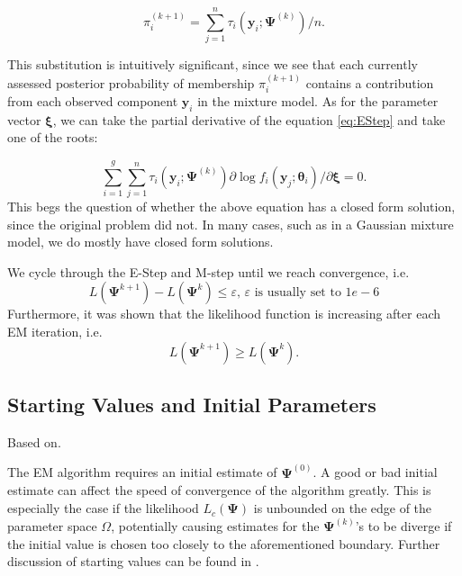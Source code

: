 \documentclass{article}\usepackage[]{graphicx}\usepackage[]{xcolor}
\theoremstyle{plain}
\theoremstyle{definition}
\theoremstyle{remark}
\newcommand{\boldy}{\mathbf{y}}
\newcommand{\boldtheta}{\boldsymbol{\theta}}
\newcommand{\boldPsi}{\boldsymbol{\Psi}}
\newcommand{\boldxi}{\boldsymbol{\xi}}
\begin{document}
\begin{equation}\label{eq:MStep1}
  \pi_i^{(k+1)} = \sum_{j=1}^n \tau_i (\boldy_i ; \boldPsi^{(k)}) / n.
\end{equation}

This substitution is intuitively significant, since we see that each currently assessed posterior probability of membership $\pi_i^{(k+1)}$ contains a contribution from each observed component $\boldy_i$ in the mixture model. As for the parameter vector $\boldxi$, we can take the partial derivative of the equation \eqref{eq:EStep} and take one of the roots:

\begin{equation}\label{eq:MStep2}
  \sum_{i=1}^g \sum_{j=1}^n \tau_i (\boldy_i ; \boldPsi^{(k)}) \partial \log f_i (\boldy_j ; \boldtheta_i) / \partial \boldxi = 0.
\end{equation}
This begs the question of whether the above equation has a closed form solution, since the original problem did not. In many cases, such as in a Gaussian mixture model, we do mostly have closed form solutions.

We cycle through the E-Step and M-step until we reach convergence, i.e.
\begin{equation*}
  L(\boldPsi^{k+1}) - L(\boldPsi^{k}) \leq \varepsilon, \, \varepsilon \text{ is usually set to } 1e-6
\end{equation*}
Furthermore, it was shown that the likelihood function is increasing after each EM iteration, i.e.
\begin{equation}
  L(\boldPsi^{k+1}) \geq L(\boldPsi^{k}).
\end{equation}


\subsection{Starting Values and Initial Parameters}
Based on\cite[Sections 2.10, 2.12]{FMMs_Book}.

The EM algorithm requires an initial estimate of $\boldPsi^{(0)}$. A good or bad initial estimate can affect the speed of convergence of the algorithm greatly. This is especially the case if the likelihood $L_c(\boldPsi)$ is unbounded on the edge of the parameter space $\Omega$, potentially causing estimates for the $\boldPsi^{(k)}$'s to be diverge if the initial value is chosen too closely to the aforementioned boundary. Further discussion  of starting values can be found in \cite[Section 3.8]{FMMs_Book}.
\end{document}

